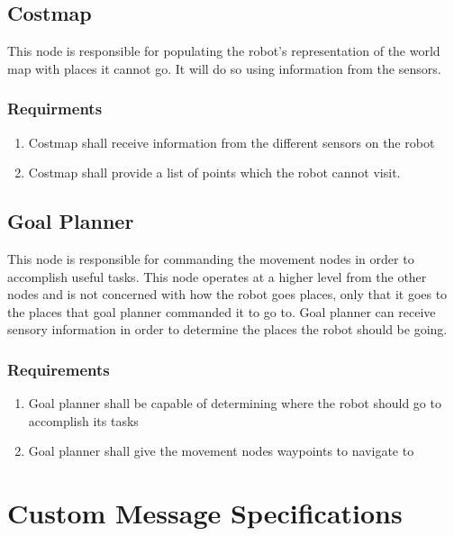 \subsection{Costmap}

This node is responsible for populating the robot's representation of the world map with places it cannot go. It will do so using information from the sensors.

  \subsubsection{Requirments}
  \begin{enumerate}
    \item Costmap shall receive information from the different sensors on the robot
    \item Costmap shall provide a list of points which the robot cannot visit.
  \end{enumerate}
       
\subsection{Goal Planner}

This node is responsible for commanding the movement nodes in order to accomplish useful tasks. This node operates at a higher level from the other nodes and is not concerned with how the robot goes places, only that it goes to the places that goal planner commanded it to go to. Goal planner can receive sensory information in order to determine the places the robot should be going.

  \subsubsection{Requirements}
  \begin{enumerate}
    \item Goal planner shall be capable of determining where the robot should go to accomplish its tasks
    \item Goal planner shall give the movement nodes waypoints to navigate to
  \end{enumerate}

\section{Custom Message Specifications}

